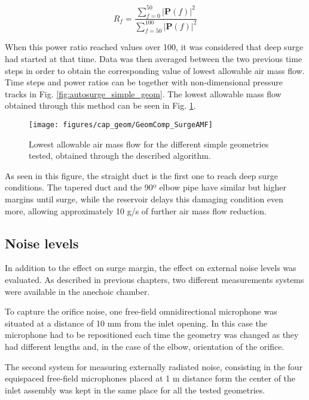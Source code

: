 \begin{equation}
	R_f=\frac{\sum_{f=0}^{50}|\mathbf{P}(f)|^2}{\sum_{f=50}^{100}|\mathbf{P}(f)|^2}
\end{equation}

When this power ratio reached values over 100, it was considered that deep surge had started at that time. Data was then averaged between the two previous time steps in order to obtain the corresponding value of lowest allowable air mass flow. Time steps and power ratios can be together with non-dimensional pressure tracks in Fig. \ref{fig:autosurge_simple_geom}. The lowest allowable mass flow obtained through this method can be seen in Fig. \ref{fig:minFlow_simple_geom}.

\begin{figure}[htb!]
\centering
\texttt{[image: figures/cap\_geom/GeomComp\_SurgeAMF]}
\caption{Lowest allowable air mass flow for the different simple geometries tested, obtained through the described algorithm.}
\label{fig:minFlow_simple_geom}
\end{figure}

As seen in this figure, the straight duct is the first one to reach  deep surge conditions. The tapered duct and the 90º elbow pipe have similar but higher margins until surge, while the reservoir delays this damaging condition even more, allowing approximately 10 g/s of further air mass flow reduction.

\subsection{Noise levels}

In addition to the effect on surge margin, the effect on external noise levels was evaluated. As described in previous chapters, two different measurements systems were available in the anechoic chamber. 

To capture the orifice noise, one free-field omnidirectional microphone was situated at a distance of 10 mm from the inlet opening. In this case the microphone had to be repositioned each time the geometry was changed as they had different lengths and, in the case of the elbow, orientation of the orifice.

The second system for measuring externally radiated noise, consisting in the four equispaced free-field microphones placed at 1 m distance form the center of the inlet assembly was kept in the same place for all the tested geometries. 

